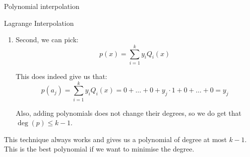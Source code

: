 \documentclass[a4paper]{article}
\begin{document}
\begin{parag}{Polynomial interpolation}
\begin{subparag}{Lagrange Interpolation}
\begin{enumerate}
                To make such a polynomial, we notice that the following almost has the right property, it is equal to 0 when $x = a_j$ for $j\neq i$, but it is not always equal to 1 when $x = a_i$: 
                \[\prod_{j \neq i}^{} \left(x - a_j\right)\]
                 
                So, to get 1 when $x = a_i$, we only need to normalise it: 
                \[Q_i\left(x\right) = \frac{\prod_{j \neq i}^{} \left(x - a_j\right)}{\prod_{j\neq i}^{} \left(a_i - a_j\right)}\]

                As required, this is of degree less than or equal to $k-1$.
                
            \item Second, we can pick: 
                \[p\left(x\right) = \sum_{i=1}^{k} y_i Q_i\left(x\right)\]
                
              This does indeed give us that:
              \[p\left(a_j\right) = \sum_{i=1}^{k} y_i Q_i\left(x\right) = 0 + \ldots + 0 + y_j \cdot 1 + 0 + \ldots + 0 = y_j\]
              
              Also, adding polynomials does not change their degrees, so we do get that $\deg\left(p\right) \leq k -1$.

        \end{enumerate}

        This technique always works and gives us a polynomial of degree at most $k - 1$. This is the best polynomial if we want to minimise the degree.
    \end{subparag}
\end{parag}
\end{document}
